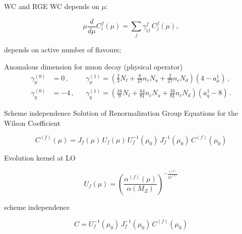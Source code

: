 \documentclass[11pt]{beamer}
\begin{document}
\begin{frame}{WC and RGE}
WC depends on $\mu$:

\begin{equation}
\mu \frac{d}{d\mu} C^f_i(\mu)
=
\sum_j \gamma^f_{ij} \, C^f_j(\mu),
\end{equation}

\begin{itemize}
depends on active number of flavours;
\end{itemize}

Anomalous dimension for muon decay (physical operator)
\begin{align}
  \gamma^{(0)}_\mu &= 0\,,  & &
  \gamma^{(1)}_\mu =
   \left( \frac{2}{3} N_\ell
    +\frac{8}{27} n_c N_u
    +\frac{2}{27} n_c N_d
   \right)(4-a^1_\mu)
  \,,\\
  \gamma^{(0)}_q   &= -4\,, & &
  \gamma^{(1)}_q = 
        \left(
          \frac{16}{9} N_\ell
         +\frac{64}{81} n_c N_u
         +\frac{16}{81} n_c N_d
         \right)(a_q^1-8)
  \,.
\end{align}

\end{frame}










\begin{frame}{Scheme independence}
Solution of Renormalization Group Equations for the Wilson Coefficient

\begin{equation}
C^{(f)}(\mu)
=
J_f(\mu)\,
U_f(\mu)\,
U_f^{-1}(\mu_0)\,
J_f^{-1}(\mu_0)\,
C^{(f)}(\mu_0)
\end{equation}

Evolution kernel at LO

\begin{equation}
U_f(\mu)
=
\left(
\frac{\alpha^{(f)}(\mu)}
{\alpha(M_Z)}
\right)^{-\frac{\gamma^{(0)}}{2 \beta^{(0)}}}
\end{equation}

scheme independence

\begin{equation}
C = U_f^{-1}(\mu_0)\,
J_f^{-1}(\mu_0)\,
C^{(f)}(\mu_0)
\end{equation}

\end{frame}
\end{document}
